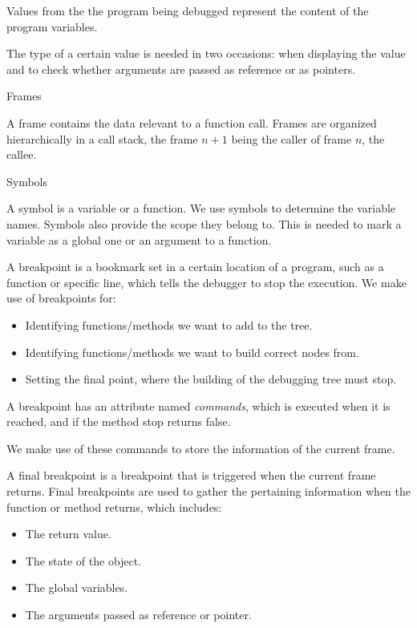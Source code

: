 \begin{description}

\item[Values.]
Values from the the program being debugged represent the content of the program variables.

\item[Types.]
The type of a certain value is needed in two occasions: when displaying the value and to check whether arguments are passed as reference or as pointers.
\item Frames

A frame contains the data relevant to a function call.
Frames are organized hierarchically in a call stack, the frame \(n+1\) being the caller of frame \(n\), the callee.
\item Symbols

A symbol is a variable or a function. We use symbols to determine the variable names. Symbols also provide the scope they belong to. This is needed to mark a variable as a global one or an argument to a function.
\item[Breakpoints.]
A breakpoint is a bookmark set in a certain location of a program, such as a function or specific line, which tells the debugger to stop the execution.
We make use of breakpoints for:
\begin{itemize}
    \item Identifying functions/methods we want to add to the tree.
    \item Identifying functions/methods we want to build correct nodes from.
    \item Setting the final point, where the building of the debugging tree must stop.
\end{itemize}
A breakpoint has an attribute named \emph{commands}, which is executed when it is reached, and if the method stop returns false.

We make use of these commands to store the information of the current frame.
\item[Final breakpoints.]
A final breakpoint is a breakpoint that is triggered when the current frame returns. Final breakpoints are used to gather the pertaining information when the function or method returns, which includes:
\begin{itemize}
    \item The return value.
    \item The state of the object.
    \item The global variables.
    \item The arguments passed as reference or pointer.
\end{itemize}
\end{description}
